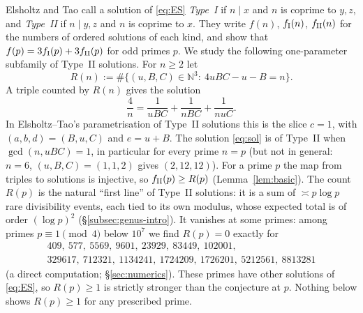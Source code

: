 \documentclass[11pt,reqno]{amsart}
\theoremstyle{definition}
\newcommand{\N}{\mathbb N}
\begin{document}
Elsholtz and Tao \cite{ET} call a solution of \eqref{eq:ES}
\emph{Type~I} if $n\mid x$ and $n$ is coprime to $y,z$, and
\emph{Type~II} if $n\mid y,z$ and $n$ is coprime to $x$.  They write
$f(n)$, $f_{\rm I}(n)$, $f_{\rm II}(n)$ for the numbers of ordered
solutions of each kind, and show \cite[(1.4)]{ET} that
$f(p)=3f_{\rm I}(p)+3f_{\rm II}(p)$ for odd primes $p$.  We study the
following one-parameter subfamily of Type~II solutions.  For $n\ge 2$
let
\begin{equation}\label{eq:Rdef}
 R(n):=\#\{(u,B,C)\in\N^3:\ 4uBC-u-B=n\}.
\end{equation}
A triple counted by $R(n)$ gives the solution
\begin{equation}\label{eq:sol}
 \frac4n=\frac1{uBC}+\frac1{nBC}+\frac1{nuC}.
\end{equation}
In Elsholtz--Tao's parametrisation of Type~II solutions
\cite[Prop.~2.6, (2.13)--(2.22)]{ET} this is the slice $c=1$, with
$(a,b,d)=(B,u,C)$ and $e=u+B$.  The solution \eqref{eq:sol} is of
Type~II when $\gcd(n,uBC)=1$, in particular for every prime $n=p$ (but
not in general: $n=6$, $(u,B,C)=(1,1,2)$ gives $(2,12,12)$).  For a prime
$p$ the map from triples to solutions is injective, so $f_{\rm
II}(p)\ge R(p)$ (Lemma~\ref{lem:basic}).  The count $R(p)$ is
the natural ``first line'' of Type~II solutions: it is a sum of $\asymp
p\log p$ rare divisibility events, each tied to its own modulus, whose
expected total is of order $(\log p)^2$ (\S\ref{subsec:genus-intro}).
It vanishes at some primes: among primes $p\equiv1\pmod4$ below $10^7$
we find $R(p)=0$ exactly for
\begin{gather*}
409,\ 577,\ 5569,\ 9601,\ 23929,\ 83449,\ 102001,\\ 329617,\ 712321,\ 1134241,\ 1724209,\ 1726201,\ 5212561,\ 8813281
\end{gather*}
(a direct computation; \S\ref{sec:numerics}).  These primes have other
solutions of \eqref{eq:ES}, so $R(p)\ge1$ is strictly stronger than the
conjecture at $p$.  Nothing below shows $R(p)\ge1$ for any prescribed
prime.
\end{document}
